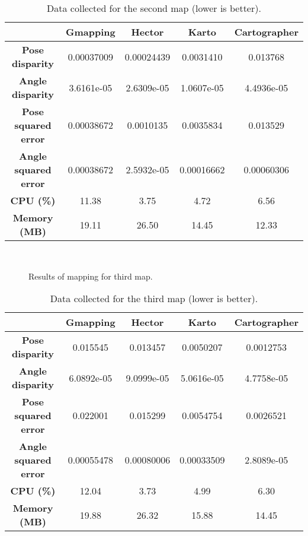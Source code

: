 \begin{table}[!ht]
\centering
\renewcommand*{\arraystretch}{1.1}
\begin{tabular}{c|c|c|c|c}
& \textbf{Gmapping} & \textbf{Hector} & \textbf{Karto} & \textbf{Cartographer} \\ \hline
\textbf{Pose disparity} & 0.00037009 & 0.00024439 & 0.0031410 & 0.013768 \\
\textbf{Angle disparity} & 3.6161e-05 & 2.6309e-05 & 1.0607e-05 & 4.4936e-05 \\
\textbf{Pose squared error} & 0.00038672 & 0.0010135 & 0.0035834 & 0.013529 \\
\textbf{Angle squared error} & 0.00038672 & 2.5932e-05 & 0.00016662 & 0.00060306 \\
\textbf{CPU (\%)} & 11.38 & 3.75 & 4.72 & 6.56 \\
\textbf{Memory (MB)} & 19.11 & 26.50 & 14.45 & 12.33 \\ \hline
\end{tabular}
\caption{Data collected for the second map (lower is better).}
\label{tab:results2}
\end{table}

\begin{figure}[!ht]
     \centering
     \hspace{1cm}
     \\
     \hspace{1cm}
     \caption{Results of mapping for third map.}
     \label{fig:results3}
\end{figure}

\begin{table}[!ht]
\centering
\renewcommand*{\arraystretch}{1.1}
\begin{tabular}{c|c|c|c|c}
& \textbf{Gmapping} & \textbf{Hector} & \textbf{Karto} & \textbf{Cartographer} \\ \hline
\textbf{Pose disparity} & 0.015545 & 0.013457 & 0.0050207 & 0.0012753 \\
\textbf{Angle disparity} & 6.0892e-05 & 9.0999e-05 & 5.0616e-05 & 4.7758e-05 \\
\textbf{Pose squared error} & 0.022001 & 0.015299 & 0.0054754 & 0.0026521 \\
\textbf{Angle squared error} & 0.00055478 & 0.00080006 & 0.00033509 & 2.8089e-05 \\
\textbf{CPU (\%)} & 12.04 & 3.73 & 4.99 & 6.30 \\
\textbf{Memory (MB)} & 19.88 & 26.32 & 15.88 & 14.45 \\ \hline
\end{tabular}
\caption{Data collected for the third map (lower is better).}
\label{tab:results3}
\end{table}
\clearpage


